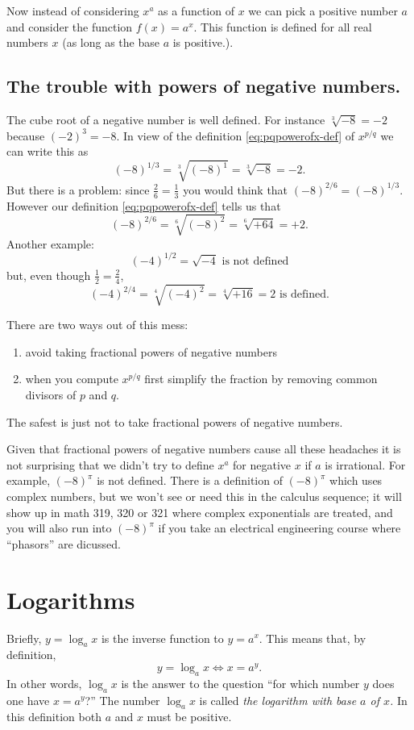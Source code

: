 Now instead of considering $x^a$ as a function of $x$ we can pick a positive
number $a$ and consider the function $f(x) = a^x$. This function is defined for
all real numbers $x$ (as long as the base $a$ is positive.).

\subsection{The trouble with powers of negative numbers. }
The cube root of a negative number is well defined.  For instance
$\sqrt[3]{-8}=-2$ because $(-2)^3 = -8$.  In view of the definition
\eqref{eq:pqpowerofx-def} of $x^{p/q}$ we can write this as
\[
(-8)^{1/3} = \sqrt[3]{(-8)^1} = \sqrt[3]{-8} = -2.
\]
But there is a problem: since $\frac{2}{6}=\frac13$ you would think that
$(-8)^{2/6} = (-8)^{1/3}$.  However our definition \eqref{eq:pqpowerofx-def}
tells us that
\[
(-8)^{2/6} = \sqrt[6]{(-8)^2} = \sqrt[6]{+64} =  +2.
\]
Another example:
\[
(-4)^{1/2} = \sqrt{-4} \text{ is not defined}
\]
but, even though $\frac12=\frac24$, 
\[
(-4)^{2/4} = \sqrt[4]{(-4)^2}  = \sqrt[4]{+16} = 2 \text{ is defined.}
\]

There are two ways out of this mess:
\begin{enumerate}\sffamily\itshape
\item avoid taking fractional powers of negative numbers
\item when you compute $x^{p/q}$ first simplify the fraction by removing
  common divisors of $p$ and $q$.
\end{enumerate}
The safest is just not to take fractional powers of negative numbers.

Given that fractional powers of negative numbers cause all these
headaches it is not surprising that we didn't try to define $x^a$ for
negative $x$ if $a$ is irrational.  For example, $(-8)^\pi$ is not
defined.  There is a definition of $(-8)^\pi$ which uses complex
numbers, but we won't see or need this in the calculus sequence; it
will show up in math 319, 320 or 321 where complex exponentials are
treated, and you will also run into $(-8)^\pi$ if you take an
electrical engineering course where ``phasors'' are dicussed.



\section{Logarithms}
Briefly, $y=\log_a x$ is the inverse function to $y=a^x$. This means
that, by definition, 
\[
y=\log_a x \iff x=a^y.
\]
In other words, $\log_a x$ is the answer to the question ``for which number $y$
does one have $x=a^y$?''  The number $\log_a x$ is called \emph{the logarithm
  with base $a$ of $x$.}
In this definition both $a $ and $x$ must be positive.

